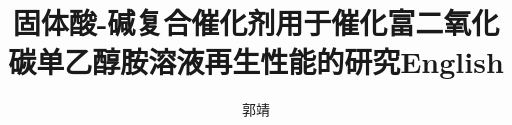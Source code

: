 \documentclass[doctor]{hnuthesis}
\title{固体酸-碱复合催化剂用于催化富二氧化碳单乙醇胺溶液再生性能的研究English}
\author{郭靖}
\begin{document}
\maketitle


\tableofcontents
\begingroup
    \renewcommand*{\addvspace}[1]{}
        \listoffigures
        \newpage

        \listoftables
        \newpage
\endgroup

\mainmatter





\appendix


\backmatter



\end{document}
